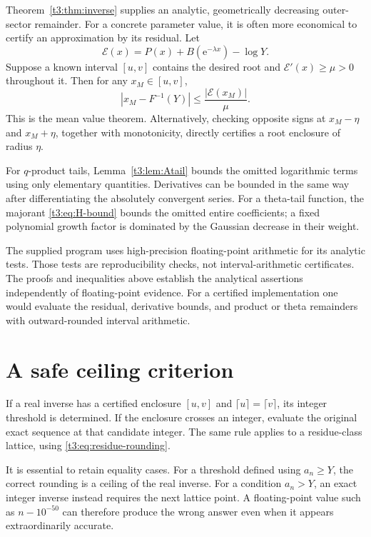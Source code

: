 \documentclass[11pt,openany]{book}
\numberwithin{equation}{chapter}
\theoremstyle{plain}
\theoremstyle{definition}
\theoremstyle{remark}
\newcommand{\ee}{\mathrm e}
\begin{document}
Theorem~\ref{t3:thm:inverse} supplies an analytic, geometrically decreasing outer-sector remainder. For a concrete parameter value, it is often more economical to certify an approximation by its residual. Let
\begin{equation}\label{t3:eq:residual}
 \mathcal E(x)=P(x)+B(\ee^{-\lambda x})-\log Y.
\end{equation}
Suppose a known interval $[u,v]$ contains the desired root and
$\mathcal E'(x)\ge\mu>0$ throughout it. Then for any $x_M\in[u,v]$,
\begin{equation}\label{t3:eq:residualbound}
 |x_M-F^{-1}(Y)|\le\frac{|\mathcal E(x_M)|}{\mu}.
\end{equation}
This is the mean value theorem. Alternatively, checking opposite signs at
$x_M-\eta$ and $x_M+\eta$, together with monotonicity, directly certifies a root enclosure of radius $\eta$.

For $q$-product tails, Lemma~\ref{t3:lem:Atail} bounds the omitted logarithmic terms using only elementary quantities. Derivatives can be bounded in the same way after differentiating the absolutely convergent series. For a theta-tail function, the majorant \eqref{t3:eq:H-bound} bounds the omitted entire coefficients; a fixed polynomial growth factor is dominated by the Gaussian decrease in their weight.

The supplied program uses high-precision floating-point arithmetic for its analytic tests. Those tests are reproducibility checks, not interval-arithmetic certificates. The proofs and inequalities above establish the analytical assertions independently of floating-point evidence. For a certified implementation one would evaluate the residual, derivative bounds, and product or theta remainders with outward-rounded interval arithmetic.

\section{A safe ceiling criterion}

If a real inverse has a certified enclosure $[u,v]$ and
$\lceil u\rceil=\lceil v\rceil$, its integer threshold is determined. If the enclosure crosses an integer, evaluate the original exact sequence at that candidate integer. The same rule applies to a residue-class lattice, using \eqref{t3:eq:residue-rounding}.

It is essential to retain equality cases. For a threshold defined using $a_n\ge Y$, the correct rounding is a ceiling of the real inverse. For a condition $a_n>Y$, an exact integer inverse instead requires the next lattice point. A floating-point value such as $n-10^{-50}$ can therefore produce the wrong answer even when it appears extraordinarily accurate.
\end{document}
